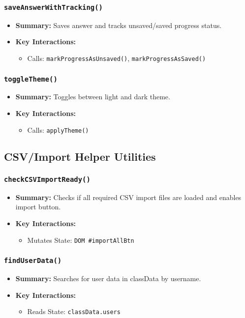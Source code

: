 \documentclass[11pt,letterpaper]{article}
\begin{document}
\subsubsection{\texttt{saveAnswerWithTracking()}}
\begin{itemize}
    \item \textbf{Summary:} Saves answer and tracks unsaved/saved progress status.
    \item \textbf{Key Interactions:}
    \begin{itemize}
        \item Calls: \texttt{markProgressAsUnsaved()}, \texttt{markProgressAsSaved()}
    \end{itemize}
\end{itemize}

\subsubsection{\texttt{toggleTheme()}}
\begin{itemize}
    \item \textbf{Summary:} Toggles between light and dark theme.
    \item \textbf{Key Interactions:}
    \begin{itemize}
        \item Calls: \texttt{applyTheme()}
    \end{itemize}
\end{itemize}

\subsection{CSV/Import Helper Utilities}

\subsubsection{\texttt{checkCSVImportReady()}}
\begin{itemize}
    \item \textbf{Summary:} Checks if all required CSV import files are loaded and enables import button.
    \item \textbf{Key Interactions:}
    \begin{itemize}
        \item Mutates State: \texttt{DOM \#importAllBtn}
    \end{itemize}
\end{itemize}

\subsubsection{\texttt{findUserData()}}
\begin{itemize}
    \item \textbf{Summary:} Searches for user data in classData by username.
    \item \textbf{Key Interactions:}
    \begin{itemize}
        \item Reads State: \texttt{classData.users}
    \end{itemize}
\end{itemize}
\end{document}
